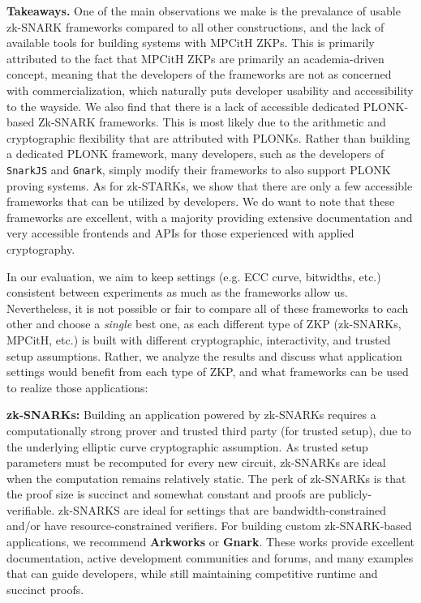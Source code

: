 \textbf{Takeaways.} One of the main observations we make is the prevalance of usable zk-SNARK frameworks compared to all other constructions, and the lack of available tools for building systems with MPCitH ZKPs. This is primarily attributed to the fact that MPCitH ZKPs are primarily an academia-driven concept, meaning that the developers of the frameworks are not as concerned with commercialization, which naturally puts developer usability and accessibility to the wayside.
We also find that there is a lack of accessible dedicated PLONK-based Zk-SNARK frameworks. This is most likely due to the arithmetic and cryptographic flexibility that are attributed with PLONKs. Rather than building a dedicated PLONK framework, many developers, such as the developers of \texttt{SnarkJS} and \texttt{Gnark}, simply modify their frameworks to also support PLONK proving systems. As for zk-STARKs, we show that there are only a few accessible frameworks that can be utilized by developers. We do want to note that these frameworks are excellent, with a majority providing extensive documentation and very accessible frontends and APIs for those experienced with applied cryptography.

In our evaluation, we aim to keep settings (e.g. ECC curve, bitwidths, etc.) consistent between experiments as much as the frameworks allow us.
Nevertheless, it is not possible or fair to compare all of these frameworks to each other and choose a \textit{single} best one, as each different type of ZKP (zk-SNARKs, MPCitH, etc.) is built with different cryptographic, interactivity, and trusted setup assumptions. Rather, we analyze the results and discuss what application settings would benefit from each type of ZKP, and what frameworks can be used to realize those applications:

\textbf{zk-SNARKs: } Building an application powered by zk-SNARKs requires a computationally strong prover and trusted third party (for trusted setup), due to the underlying elliptic curve cryptographic assumption. As trusted setup parameters must be recomputed for every new circuit, zk-SNARKs are ideal when the computation remains relatively static. The perk of zk-SNARKs is that the proof size is succinct and somewhat constant and proofs are publicly-verifiable. zk-SNARKS are ideal for settings that are bandwidth-constrained and/or have resource-constrained verifiers. For building custom zk-SNARK-based applications, we recommend \textbf{Arkworks} or \textbf{Gnark}. These works provide excellent documentation, active development communities and forums, and many examples that can guide developers, while still maintaining competitive runtime and succinct proofs.

